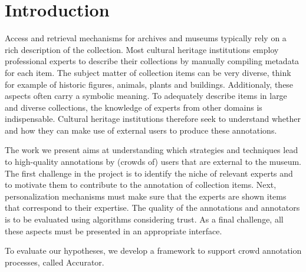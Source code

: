 \section{Introduction}\label{introduction}
Access and retrieval mechanisms for archives and museums typically rely on a rich description of the collection. 
Most cultural heritage institutions employ professional experts to describe their collections by manually compiling metadata for each item. 
The subject matter of collection items can be very diverse, think for example of historic figures, animals, plants and buildings. Additionaly, these aspects often carry a symbolic meaning.
To adequately describe items in large and diverse collections, the knowledge of experts from other domains is indispensable.
Cultural heritage institutions therefore seek to understand whether and how they can make use of external users to produce these annotations.

The work we present aims at understanding which strategies and techniques lead to high-quality annotations by (crowds of) users that are external to the museum. 
The first challenge in the project is to identify the niche of relevant experts and to motivate them to contribute to the annotation of collection items. 
Next, personalization mechanisms must make sure that the experts are shown items that correspond to their expertise. 
The quality of the annotations and annotators is to be evaluated using algorithms considering trust. As a final challenge, all these aspects must be presented in an appropriate interface.

To evaluate our hypotheses, we develop a framework to support crowd annotation processes, called Accurator. 